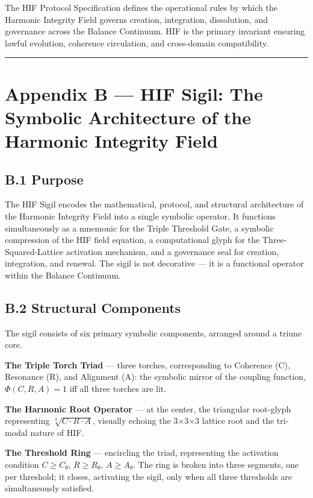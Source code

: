 The HIF Protocol Specification defines the operational rules by which the Harmonic Integrity Field governs creation, integration, dissolution, and governance across the Balance Continuum. HIF is the primary invariant ensuring lawful evolution, coherence circulation, and cross-domain compatibility.

\begin{center}\rule{0.5\linewidth}{0.5pt}\end{center}

\section{Appendix B --- HIF Sigil: The Symbolic Architecture of the Harmonic Integrity Field}\label{appendix-b-hif-sigil-the-symbolic-architecture-of-the-harmonic-integrity-field}

\subsection{B.1 Purpose}\label{b.1-purpose}

The HIF Sigil encodes the mathematical, protocol, and structural architecture of the Harmonic Integrity Field into a single symbolic operator. It functions simultaneously as a mnemonic for the Triple Threshold Gate, a symbolic compression of the HIF field equation, a computational glyph for the Three-Squared-Lattice activation mechanism, and a governance seal for creation, integration, and renewal. The sigil is not decorative --- it is a functional operator within the Balance Continuum.

\subsection{B.2 Structural Components}\label{b.2-structural-components}

The sigil consists of six primary symbolic components, arranged around a triune core.

\textbf{The Triple Torch Triad} --- three torches, corresponding to Coherence (C), Resonance (R), and Alignment (A): the symbolic mirror of the coupling function, \(\Phi(C,R,A) = 1\) iff all three torches are lit.

\textbf{The Harmonic Root Operator} --- at the center, the triangular root-glyph representing \(\sqrt[3]{C \cdot R \cdot A}\), visually echoing the 3×3×3 lattice root and the tri-modal nature of HIF.

\textbf{The Threshold Ring} --- encircling the triad, representing the activation condition \(C \ge C_{\theta},\, R \ge R_{\theta},\, A \ge A_{\theta}\). The ring is broken into three segments, one per threshold; it closes, activating the sigil, only when all three thresholds are simultaneously satisfied.


